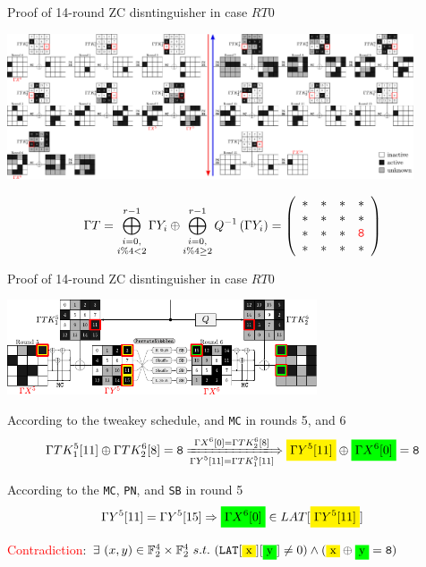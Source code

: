 \documentclass{beamer}
\newcommand{\mathcolorbox}[2]{\colorbox{#1}{$\displaystyle #2$}}
\begin{document}
\begin{frame}{Proof of 14-round ZC disntinguisher in case $RT0$}
\begin{center}
    \includegraphics[width = 12cm]{./Images/zc_14r_tk0_1.pdf}
\end{center}
\[\Gamma T = \bigoplus_{\substack{i = 0,\\ i \% 4 < 2}}^{r - 1} \Gamma Y_{i} \oplus \bigoplus_{\substack{i = 0,\\ i \% 4 \geq 2}}^{r - 1} Q^{-1}\left( \Gamma Y_{i}\right) = \left( {\begin{array}{*{20}{c}}
*&*&*&*\\
*&*&*&*\\
*&*&*&\textcolor{red}{\texttt{8}}\\
*&*&*&*
\end{array}} \right)\]
\end{frame}

\begin{frame}{Proof of 14-round ZC disntinguisher in case $RT0$}
\begin{center}
    \includegraphics[height = 2.8cm]{./Images/zc_14r_rt0_contradiction_part.pdf}
\end{center}
\begin{block}{According to the tweakey schedule, and \texttt{MC} in rounds 5, and 6}
\[\Gamma TK_{1}^{5}[11] \oplus \Gamma TK_{2}^{6}[8]=\texttt{8}
\xLongrightarrow[\scriptstyle{\Gamma Y^{5}[11] = \Gamma TK_{1}^{5}[11]}]{\scriptstyle{\Gamma X^{6}[0] = \Gamma TK_{2}^{6}[8]}}
\mathcolorbox{yellow}{\Gamma Y^{5}[11]} \oplus \mathcolorbox{green}{\Gamma X^{6}[0]} = \texttt{8}\]
\end{block}

\begin{block}{According to the \texttt{MC}, \texttt{PN}, and \texttt{SB} in round 5}
\[\Gamma Y^{5}[11] = \Gamma Y^{5}[15] \Rightarrow
\mathcolorbox{green}{\Gamma X^{6}[0]} \in LAT[\mathcolorbox{yellow}{\Gamma Y^{5}[11]}]\]
\end{block}
\textcolor{red}{Contradiction}:
$\exists ~ (x, y)\in \mathbb{F}_{2}^{4}\times \mathbb{F}_{2}^4 ~ s.t. ~  (\texttt{LAT}[\colorbox{yellow}{x}][\colorbox{green}{y}] \neq 0) \wedge (\colorbox{yellow}{x} \oplus \colorbox{green}{y} = \texttt{8})$
\end{frame}
\end{document}
